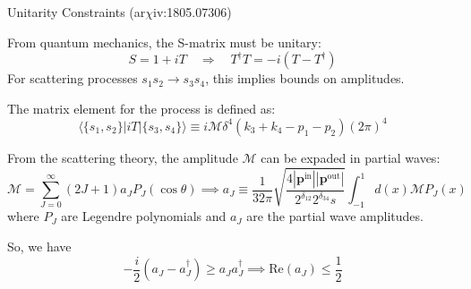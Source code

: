 \documentclass{../bredelebeamer}
\newcommand{\arxiv}{ar$\chi$iv:}
\begin{document}
\begin{frame}{Unitarity Constraints (\arxiv 1805.07306)}

From quantum mechanics, the S-matrix must be unitary:
\begin{equation*}
S = 1 + iT \quad \Rightarrow \quad T^\dagger T = -i(T - T^\dagger)
\end{equation*}
For scattering processes $s_1 s_2 \rightarrow s_3 s_4$, this implies bounds on amplitudes.\vfill 

The matrix element for the process is defined as:
\begin{equation*}
\langle\{s_1, s_2 \}|iT|\{s_3, s_4\}\rangle \equiv i\mathcal{M}\delta^4(k_3+k_4-p_1-p_2)(2\pi)^4
\end{equation*}

From the scattering theory, the amplitude $\mathcal{M}$ can be expaded in partial waves:
\begin{equation*}
\mathcal{M} = \sum_{J=0}^{\infty}(2J+1)a_J P_J(\cos\theta)
\implies
a_J \equiv \frac{1}{32 \pi} \sqrt{\frac{4\left|\mathbf{p}^{\text{in}}\right|\left|\mathbf{p}^{\text{out}}\right|}{2^{\delta_{12}} 2^{\delta_{34}} s}} \int_{-1}^1 d(x) \mathcal{M} P_J(x)
\end{equation*}
where $P_J$ are Legendre polynomials and $a_J$ are the partial wave amplitudes.

So, we have 
\begin{equation}
    -\frac{i}{2}\left(a_J-a_J^{\dagger}\right) \geq a_J a_J^{\dagger} 
    \implies
    \text{Re}(a_J) \leq \frac{1}{2}
\end{equation}
\end{frame}
\end{document}
